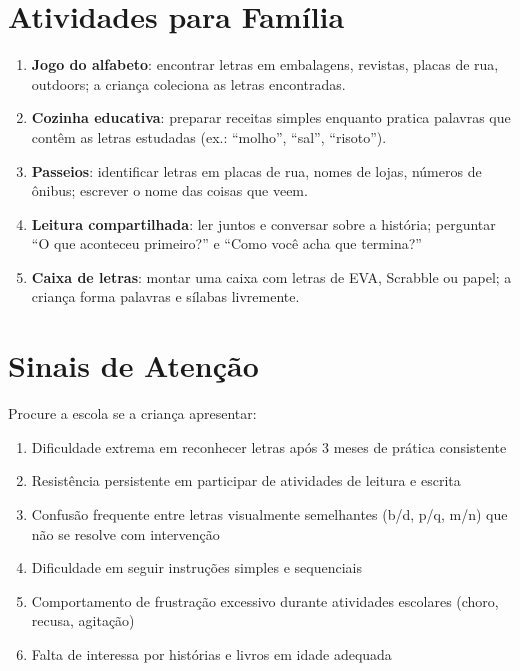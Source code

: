 \section{Atividades para Fam\'{i}lia}

\begin{enumerate}[leftmargin=2cm]
  \item \textbf{Jogo do alfabeto}: encontrar letras em embalagens,
  revistas, placas de rua, outdoors; a crian\c{c}a coleciona as
  letras encontradas.

  \item \textbf{Cozinha educativa}: preparar receitas simples enquanto
  pratica palavras que contêm as letras estudadas (ex.: ``molho'',
  ``sal'', ``risoto'').

  \item \textbf{Passeios}: identificar letras em placas de rua, nomes
  de lojas, n\'{u}meros de ônibus; escrever o nome das coisas que veem.

  \item \textbf{Leitura compartilhada}: ler juntos e conversar sobre
  a hist\'{o}ria; perguntar ``O que aconteceu primeiro?'' e ``Como
  voc\^{e} acha que termina?''

  \item \textbf{Caixa de letras}: montar uma caixa com letras de EVA,
  Scrabble ou papel; a crian\c{c}a forma palavras e s\'{i}labas
  livremente.
\end{enumerate}

\section{Sinais de Aten\c{c}\~{a}o}

Procure a escola se a crian\c{c}a apresentar:
\begin{enumerate}[leftmargin=2cm]
  \item Dificuldade extrema em reconhecer letras ap\'{o}s 3 meses
  de pr\'{a}tica consistente
  \item Resist\^{e}ncia persistente em participar de atividades
  de leitura e escrita
  \item Confus\~{a}o frequente entre letras visualmente semelhantes
  (b/d, p/q, m/n) que n\~{a}o se resolve com interven\c{c}\~{a}o
  \item Dificuldade em seguir instru\c{c}\~{o}es simples e sequenciais
  \item Comportamento de frustra\c{c}\~{a}o excessivo durante atividades
  escolares (choro, recusa, agita\c{c}\~{a}o)
  \item Falta de interessa por histórias e livros em idade adequada
\end{enumerate}

